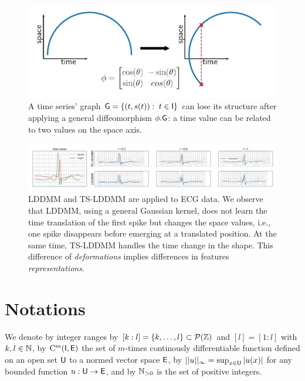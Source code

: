 \begin{figure}[t]
  \centering
  \includegraphics[width=0.7\linewidth]{"./pictures/diffeo.jpeg"}
  
  \caption{A time series' graph $\mathsf{G}=\{(t,s(t)): \; t\in\mathsf{I}\} $ can lose its structure after applying a general diffeomorphism $\phi.\mathsf{G}$: a time value can be related to two values on the space axis.}
  \label{fig:diffeo}
  
\end{figure}

\begin{figure}[t]
  \centering
  \includegraphics[width=\linewidth]{"./pictures/transport.jpeg"}
  
  \caption{LDDMM and TS-LDDMM are applied to ECG data.
  We observe that LDDMM, using a general Gaussian kernel, does not learn the time translation of the first spike but changes the space values, i.e., one spike disappears before emerging at a translated position. At the same time, TS-LDDMM handles the time change in the shape.
  This difference of \textit{deformations} implies differences in features \textit{representations}.   }
  \label{fig:transport}
  
\end{figure}

  \vspace{-1ex}
\section{Notations}
We denote by integer ranges by $[k:l]=\{k,\ldots,l\}\subset \mathcal{P}(\mathbb{Z})$ and $ [l]=[1:l]$ with $k,l\in \mathbb{N}$,
by $\mathrm{C}^m(\mathsf{I},\mathsf{E})$ the set of $m$-times continously differentiable function defined on an open set $\mathsf{U}$ to a normed vector space $\mathsf{E}$,
 by $||u||_\infty=\sup_{x\in \mathsf{U}} |u(x)| $ for any bounded function $u:\mathsf{U} \to \mathsf{E}$,
and by $\mathbb{N}_{>0}$ is the set of positive integers. 

